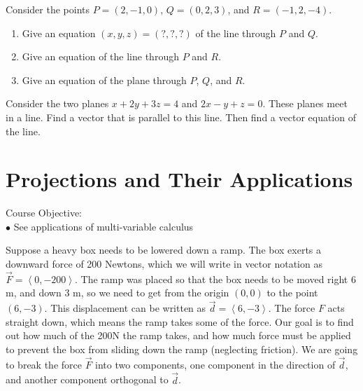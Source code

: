 \begin{problem}\label{prob:crossproduct normalvector}
 Consider the points $P=(2,-1,0)$, $Q=(0,2,3)$, and $R=(-1,2,-4)$.  
\begin{enumerate}
 \item Give an equation $(x,y,z)=(?,?,?)$ of the line through $P$ and $Q$.
 \item Give an equation of the line through $P$ and $R$.
 \item Give an equation of the plane through $P$, $Q$, and $R$. 
\end{enumerate}
\end{problem}

\begin{problem}  
%
Consider the two planes $x+2y+3z=4$ and $2x-y+z=0$.  These planes meet in a line.  Find a vector that is parallel to this line.  Then find a vector equation of the line.
\end{problem}


\section{Projections and Their Applications}
\large Course Objective: \normalsize \\
\indent $\bullet$ See applications of multi-variable calculus

\vskip0.2in

Suppose a heavy box needs to be lowered down a ramp.  
The box exerts a downward force of 200 Newtons, which we will write in vector notation as $\vec F=\left<0,-200\right>$. 
The ramp was placed so that the box needs to be moved right 6 m, and down 3 m, so we need to get from the origin $(0,0)$ to the point $(6,-3)$.  This displacement can be written as $\vec d=\left<6,-3\right>$. The force $F$ acts straight down, which means the ramp takes some of the force. Our goal is to find out how much of the 200N the ramp takes, and how much force must be applied to prevent the box from sliding down the ramp (neglecting friction). We are going to break the force $\vec F$ into two components, one component in the direction of $\vec d$, and another component orthogonal to $\vec d$. 

